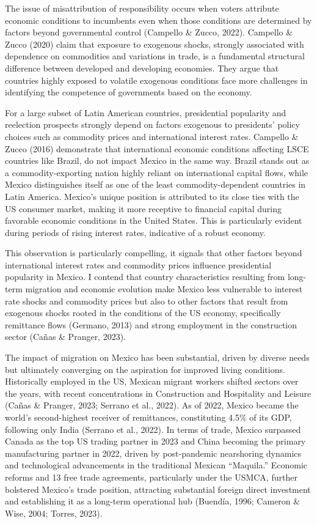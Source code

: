 \documentclass[
]{article}
\begin{document}
The issue of misattribution of responsibility occurs when voters
attribute economic conditions to incumbents even when those conditions
are determined by factors beyond governmental control (Campello \&
Zucco, 2022). Campello \& Zucco (2020) claim that exposure to exogenous
shocks, strongly associated with dependence on commodities and
variations in trade, is a fundamental structural difference between
developed and developing economies. They argue that countries highly
exposed to volatile exogenous conditions face more challenges in
identifying the competence of governments based on the economy.

For a large subset of Latin American countries, presidential popularity
and reelection prospects strongly depend on factors exogenous to
presidents' policy choices such as commodity prices and international
interest rates. Campello \& Zucco (2016) demonstrate that international
economic conditions affecting LSCE countries like Brazil, do not impact
Mexico in the same way. Brazil stands out as a commodity-exporting
nation highly reliant on international capital flows, while Mexico
distinguishes itself as one of the least commodity-dependent countries
in Latin America. Mexico's unique position is attributed to its close
ties with the US consumer market, making it more receptive to financial
capital during favorable economic conditions in the United States. This
is particularly evident during periods of rising interest rates,
indicative of a robust economy.

This observation is particularly compelling, it signals that other
factors beyond international interest rates and commodity prices
influence presidential popularity in Mexico. I contend that country
characteristics resulting from long-term migration and economic
evolution make Mexico less vulnerable to interest rate shocks and
commodity prices but also to other factors that result from exogenous
shocks rooted in the conditions of the US economy, specifically
remittance flows (Germano, 2013) and strong employment in the
construction sector (Cañas \& Pranger, 2023).

The impact of migration on Mexico has been substantial, driven by
diverse needs but ultimately converging on the aspiration for improved
living conditions. Historically employed in the US, Mexican migrant
workers shifted sectors over the years, with recent concentrations in
Construction and Hospitality and Leisure (Cañas \& Pranger, 2023;
Serrano et al., 2022). As of 2022, Mexico became the world's
second-highest receiver of remittances, constituting 4.5\% of its GDP,
following only India (Serrano et al., 2022). In terms of trade, Mexico
surpassed Canada as the top US trading partner in 2023 and China
becoming the primary manufacturing partner in 2022, driven by
post-pandemic nearshoring dynamics and technological advancements in the
traditional Mexican ``Maquila.'' Economic reforms and 13 free trade
agreements, particularly under the USMCA, further bolstered Mexico's
trade position, attracting substantial foreign direct investment and
establishing it as a long-term operational hub (Buendía, 1996; Cameron
\& Wise, 2004; Torres, 2023).
\end{document}
